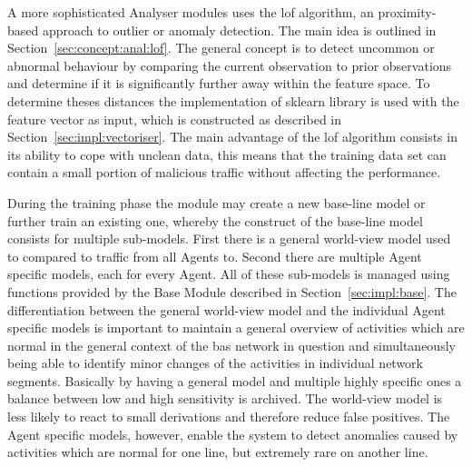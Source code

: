 \begin{comment}
	\item using this feature vector 2 models are trained per agent window
		\subitem one agent specific model
		\subitem one world model, which is trained using data from all agents (aka. the whole network)
	\item purpose of the agent model is to be able to detect traffic leakage
		\subitem i.e. traffic that is normal for one line (e.g. light switches and motion sensors) suddenly occurs in the line responsible for \gls{hvac} control
		\subitem agent model is highly trained and most probably highly sensitive, but can detect unusual behaviour which is normal for the network but not for the line
		\subitem world model is more general and not as sensitive, but cannot distinguish between purposes of lines
	\item analyser module stores 1 for being an outlier or 0 for not being an outlier in the \gls{influxdb} per window
		\subitem threshold is decided in analyser
		\subitem easier monitoring, but data get mangled doing this
		\subitem better might be to store the relative distance (output of \gls{lof}) as well
\end{itemize}
\end{comment}

A more sophisticated Analyser modules uses the \gls{lof} algorithm, an proximity-based approach to outlier or anomaly detection.
The main idea is outlined in Section~\ref{sec:concept:anal:lof}. The general concept is to detect uncommon or abnormal behaviour by comparing the current observation to prior observations and determine if it is significantly further away within the feature space.
To determine theses distances the  implementation of \gls{sklearn} library is used with the feature vector as input, which is constructed as described in Section~\ref{sec:impl:vectoriser}.
The main advantage of the \gls{lof} algorithm consists in its ability to cope with unclean data, this means that the training data set can contain a small portion of malicious traffic without affecting the performance.

During the training phase the module may create a new base-line model or further train an existing one, whereby the construct of the base-line model consists for multiple sub-models. First there is a general world-view model used to compared to traffic from all Agents to. Second there are multiple Agent specific models, each for every Agent. All of these sub-models is managed using functions provided by the Base Module described in Section~\ref{sec:impl:base}.
The differentiation between the general world-view model and the individual Agent specific models is important to maintain a general overview of activities which are normal in the general context of the \gls{bas} network in question and simultaneously being able to identify minor changes of the activities in individual network segments.
Basically by having a general model and multiple highly specific ones a balance between low and high sensitivity is archived. 
The world-view model is less likely to react to small derivations and therefore reduce false positives. The Agent specific models, however, enable the system to detect anomalies caused by activities which are normal for one line, but extremely rare on another line.

